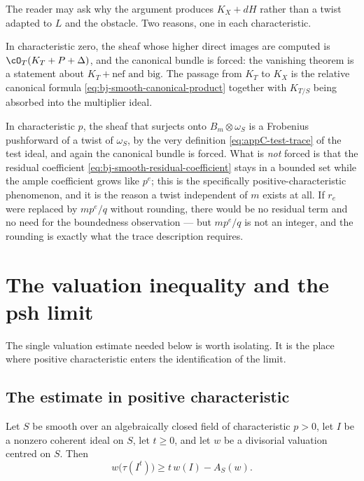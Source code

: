 \begin{remark}
\label{rem:ch40-twist-features}
The reader may ask why the argument produces $K_X+dH$ rather than a twist
adapted to $L$ and the obstacle.  Two reasons, one in each characteristic.

In characteristic zero, the sheaf whose higher direct images are computed is
$\cO_T(K_T+P+\Delta)$, and the canonical bundle is forced: the vanishing
theorem is a statement about $K_T+\text{nef and big}$.  The passage from
$K_T$ to $K_X$ is the relative canonical formula
\eqref{eq:bj-smooth-canonical-product} together with
$K_{T/S}$ being absorbed into the multiplier ideal.

In characteristic $p$, the sheaf that surjects onto $B_m\otimes\omega_S$
is a Frobenius pushforward of a twist of $\omega_S$, by the very
definition \eqref{eq:appC-test-trace} of the test ideal, and again the
canonical bundle is forced.  What is \emph{not} forced is that the residual
coefficient \eqref{eq:bj-smooth-residual-coefficient} stays in a bounded set
while the ample coefficient grows like $p^e$; this is the specifically
positive-characteristic phenomenon, and it is the reason a twist independent
of $m$ exists at all.  If $r_e$ were replaced by $mp^e/q$ without
rounding, there would be no residual term and no need for the boundedness
observation --- but $mp^e/q$ is not an integer, and the rounding is
exactly what the trace description requires.
\end{remark}

\section{The valuation inequality and the psh limit}
\label{sec:ch40-valuation}

The single valuation estimate needed below is worth isolating.  It is the
place where positive characteristic enters the identification of the
limit.

\subsection{The estimate in positive characteristic}
\label{sec:ch40-canton}

\begin{lemma}\label{lem:bj-smooth-canton}
Let $S$ be smooth over an algebraically closed field of characteristic
$p>0$, let $I$ be a nonzero coherent ideal on $S$, let $t\ge0$,
and let $w$ be a divisorial valuation centred on $S$.  Then
\[
                       w\bigl(\tau(I^t)\bigr)
                          \ge t\,w(I)-A_S(w).
\tag{40.20}\label{eq:bj-smooth-canton-test}
\]
\end{lemma}

